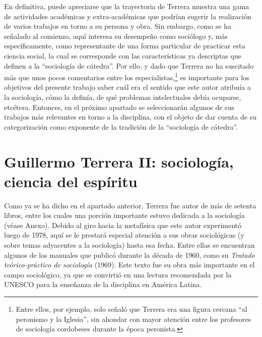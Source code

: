 En definitiva, puede apreciarse que la trayectoria de Terrera muestra una gama de actividades académicas y extra-académicas que podrían sugerir la realización de varios trabajos en torno a su persona y obra. Sin embargo, como se ha señalado al comienzo, aquí interesa su desempeño como sociólogo y, más específicamente, como representante de una forma particular de practicar esta ciencia social, la cual se corresponde con las características ya descriptas que definen a la \enquote{sociología de cátedra}. Por ello, y dado que Terrera no ha suscitado más que unos pocos comentarios entre los especialistas,\footnote{Entre ellos, por ejemplo, \textcite[22]{1447-CARACCIOLO2010} solo señaló que Terrera era una figura cercana \enquote{al peronismo y la Iglesia}, sin ahondar con mayor atención entre los profesores de sociología cordobeses durante la época peronista.} es importante para los objetivos del presente trabajo saber cuál era el sentido que este autor atribuía a la sociología, cómo la definía, de qué problemas intelectuales debía ocuparse, etcétera. Entonces, en el próximo apartado se seleccionarán algunos de sus trabajos más relevantes en torno a la disciplina, con el objeto de dar cuenta de su categorización como exponente de la tradición de la \enquote{sociología de cátedra}.

\section{Guillermo Terrera II: sociología, ciencia del espíritu}

Como ya se ha dicho en el apartado anterior, Terrera fue autor de más de setenta libros, entre los cuales una porción importante estuvo dedicada a la sociología (véase Anexo). Debido al giro hacia la metafísica que este autor experimentó luego de 1978, aquí se le prestará especial atención a sus obras sociológicas (y sobre temas adyacentes a la sociología) hasta esa fecha. Entre ellas se encuentran algunos de los manuales que publicó durante la década de 1960, como su \emph{Tratado teórico-práctico de sociología} (1969). Este texto fue su obra más importante en el campo sociológico, ya que se convirtió en una lectura recomendada por la UNESCO para la enseñanza de la disciplina en América Latina.

